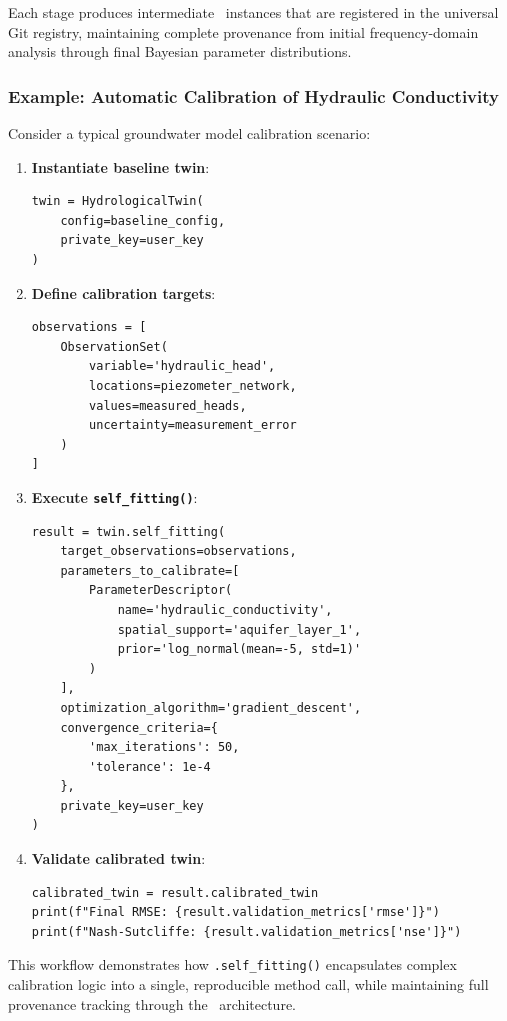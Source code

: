 Each stage produces intermediate \hydrot\ instances that are registered in the universal Git registry, maintaining complete provenance from initial frequency-domain analysis through final Bayesian parameter distributions.

\subsubsection{Example: Automatic Calibration of Hydraulic Conductivity}

Consider a typical groundwater model calibration scenario:

\begin{enumerate}
\item \textbf{Instantiate baseline twin}:
\begin{verbatim}
twin = HydrologicalTwin(
    config=baseline_config,
    private_key=user_key
)
\end{verbatim}

\item \textbf{Define calibration targets}:
\begin{verbatim}
observations = [
    ObservationSet(
        variable='hydraulic_head',
        locations=piezometer_network,
        values=measured_heads,
        uncertainty=measurement_error
    )
]
\end{verbatim}

\item \textbf{Execute \texttt{self\_fitting()}}:
\begin{verbatim}
result = twin.self_fitting(
    target_observations=observations,
    parameters_to_calibrate=[
        ParameterDescriptor(
            name='hydraulic_conductivity',
            spatial_support='aquifer_layer_1',
            prior='log_normal(mean=-5, std=1)'
        )
    ],
    optimization_algorithm='gradient_descent',
    convergence_criteria={
        'max_iterations': 50,
        'tolerance': 1e-4
    },
    private_key=user_key
)
\end{verbatim}

\item \textbf{Validate calibrated twin}:
\begin{verbatim}
calibrated_twin = result.calibrated_twin
print(f"Final RMSE: {result.validation_metrics['rmse']}")
print(f"Nash-Sutcliffe: {result.validation_metrics['nse']}")
\end{verbatim}
\end{enumerate}

This workflow demonstrates how \texttt{.self\_fitting()} encapsulates complex calibration logic into a single, reproducible method call, while maintaining full provenance tracking through the \hydrot\ architecture.

